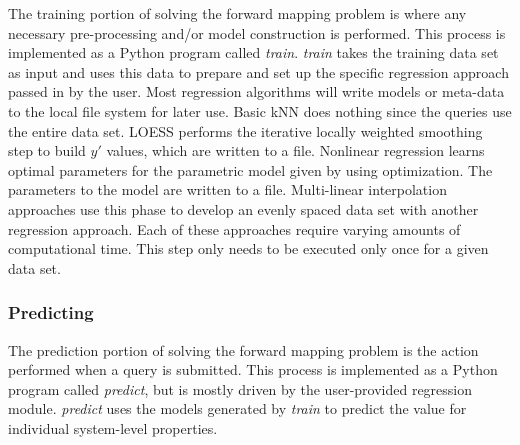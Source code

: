 The training portion of solving the forward mapping problem is where any necessary pre-processing and/or model construction is performed.
This process is implemented as a Python program called \textit{train}.
\textit{train} takes the training data set as input and uses this data
to prepare and set up the specific regression approach passed in by the user.
Most regression algorithms will write models or meta-data to the local file system for later use.
Basic kNN does nothing since the queries use the entire data set.
LOESS performs the iterative locally weighted smoothing step to build $y'$ values, which are
written to a file.
Nonlinear regression learns optimal parameters for the parametric model given by using optimization.
The parameters to the model are written to a file.
Multi-linear interpolation approaches use this phase to develop an evenly spaced data set with another regression approach.
Each of these approaches require varying amounts of computational time.
This step only needs to be executed only once for a given data set.


\subsubsection{Predicting}

The prediction portion of solving the forward mapping problem is the action performed when a query is submitted.
This process is implemented as a Python program called \textit{predict}, but is mostly driven by the user-provided regression module.
\textit{predict} uses the models generated by \textit{train} to predict the value for individual system-level properties.

